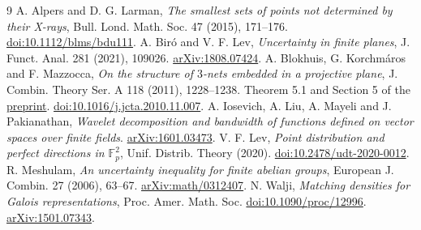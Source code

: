 \documentclass[11pt,letterpaper]{article}
\newcommand{\F}{\mathbb F}
\begin{document}
\newpage
\begin{thebibliography}{9}
 A. Alpers and D. G. Larman, \emph{The smallest sets of points not determined by their X-rays}, Bull. Lond. Math. Soc. 47 (2015), 171--176. \href{https://doi.org/10.1112/blms/bdu111}{doi:10.1112/blms/bdu111}.
 A. Bir\'o and V. F. Lev, \emph{Uncertainty in finite planes}, J. Funct. Anal. 281 (2021), 109026. \href{https://arxiv.org/abs/1808.07424}{arXiv:1808.07424}.
 A. Blokhuis, G. Korchm\'aros and F. Mazzocca, \emph{On the structure of $3$-nets embedded in a projective plane}, J. Combin. Theory Ser. A 118 (2011), 1228--1238. Theorem 5.1 and Section 5 of the \href{https://arxiv.org/abs/0911.4100}{preprint}. \href{https://doi.org/10.1016/j.jcta.2010.11.007}{doi:10.1016/j.jcta.2010.11.007}.
 A. Iosevich, A. Liu, A. Mayeli and J. Pakianathan, \emph{Wavelet decomposition and bandwidth of functions defined on vector spaces over finite fields}. \href{https://arxiv.org/abs/1601.03473}{arXiv:1601.03473}.
 V. F. Lev, \emph{Point distribution and perfect directions in $\F_p^2$}, Unif. Distrib. Theory (2020). \href{https://doi.org/10.2478/udt-2020-0012}{doi:10.2478/udt-2020-0012}.
 R. Meshulam, \emph{An uncertainty inequality for finite abelian groups}, European J. Combin. 27 (2006), 63--67. \href{https://arxiv.org/abs/math/0312407}{arXiv:math/0312407}.
 N. Walji, \emph{Matching densities for Galois representations}, Proc. Amer. Math. Soc. \href{https://doi.org/10.1090/proc/12996}{doi:10.1090/proc/12996}. \href{https://arxiv.org/abs/1501.07343}{arXiv:1501.07343}.
\end{thebibliography}
\end{document}
